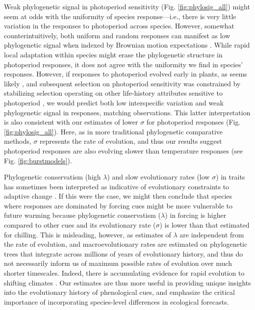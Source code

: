 \documentclass[11pt]{article}
\begin{document}
Weak phylogenetic signal in photoperiod sensitivity (Fig. \ref{fig:phylosig_all}) might seem at odds with the uniformity of species response---i.e., there is very little variation in the responses to photoperiod across species. However, somewhat counterintuitively, both uniform and random responses can manifest as low phylogenetic signal when indexed by Brownian motion expectations \citep{wiens2010niche}. While rapid local adaptation within species might erase the phylogenetic structure in photoperiod responses, it does not agree with the uniformity we find in species' responses. However, if responses to photoperiod evolved early in plants, as seems likely \citep{serrano2017}, and subsequent selection on photoperiod sensitivity was constrained by stabilizing selection operating on other life-history attributes sensitive to photoperiod \citep[e.g.,][]{Rinne:1994,Wilczek2014,azeez2015}, we would predict both low interspecific variation and weak phylogenetic signal in responses, matching observations. This latter interpretation is also consistent with our estimates of lower $\sigma$ for photoperiod responses (Fig. \ref{fig:phylosig_all}). Here, as in more traditional phylogenetic comparative methods, $\sigma$ represents the rate of evolution, and thus our results suggest photoperiod responses are also evolving slower than temperature responses (see Fig. \ref{fig:burstmodels}).

Phylogenetic conservatism (high $\lambda$) and slow evolutionary rates (low $\sigma$) in traits has sometimes been interpreted as indicative of evolutionary constraints to adaptive change \citep{wiens2010niche,bennett2021evolution}. If this were the case, we might then conclude that species where responses are dominated by forcing cues might be more vulnerable to future warming because phylogenetic conservatism ($\lambda$) in forcing is higher compared to other cues and its evolutionary rate ($\sigma$) is lower than that estimated for chilling. This is misleading, however, as estimates of $\lambda$ are independent from the rate of evolution, and macroevolutionary rates are estimated on phylogenetic trees that integrate across millions of years of evolutionary history, and thus do not necessarily inform us of maximum possible rates of evolution over much shorter timescales. Indeed, there is accumulating evidence for rapid evolution to shifting climates \citep{bradshaw2006,franks2014}. Our estimates are thus more useful in providing unique insights into the evolutionary history of phenological cues, and emphasize the critical importance of incorporating species-level differences in ecological forecasts.
\end{document}
